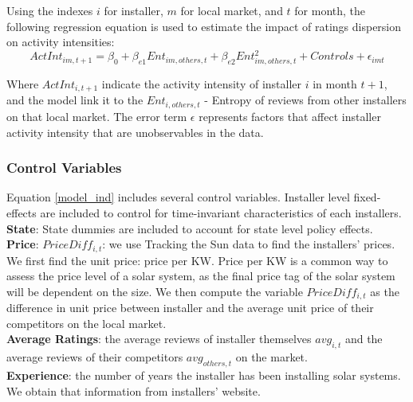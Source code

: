 \documentclass[msom,blindrev]{informs3}
\begin{document}
Using the indexes $i$ for installer, $m$ for local market, and $t$ for month, the following regression equation is used to estimate the impact of ratings dispersion on activity intensities: 
\begin{equation}
    ActInt_{im,t+1}=\beta_{0}+\beta_{e1} Ent_{im,others,t}+\beta_{e2}Ent_{im,others,t}^2+  
   Controls+\epsilon_{imt} 
   \label{model_ind}
\end{equation}

Where $ActInt_{i,t+1}$ indicate the activity intensity of installer $i$ in month $t+1$, and the model link it to the $Ent_{i,others,t}$ - Entropy of reviews from other installers on that local market. The error term $\epsilon$ represents factors that affect installer activity intensity that are unobservables in the data.  
\subsubsection{Control Variables\\}
Equation \ref{model_ind} includes several control variables. Installer level fixed-effects are included to control for time-invariant characteristics of each installers. \\	\textbf{State}: State dummies are included to account for state level policy effects. \\
\textbf{Price}:   $PriceDiff_{i,t}$: we use Tracking the Sun data to find the installers' prices. We first find the unit price: price per KW. Price per KW is a common way to assess the price level of a solar system, as the final price tag of the solar system will be dependent on the size. We then compute the variable $PriceDiff_{i,t}$ as the difference in unit price between installer and the average unit price of their competitors on the local market. \\
\textbf{Average Ratings}: the average reviews of installer themselves $avg_{i,t}$ and the average reviews of their competitors $avg_{others,t}$ on the market. \\
\textbf{Experience}: the number of years the installer has been installing solar systems. We obtain that information from installers' website. 
\end{document}
